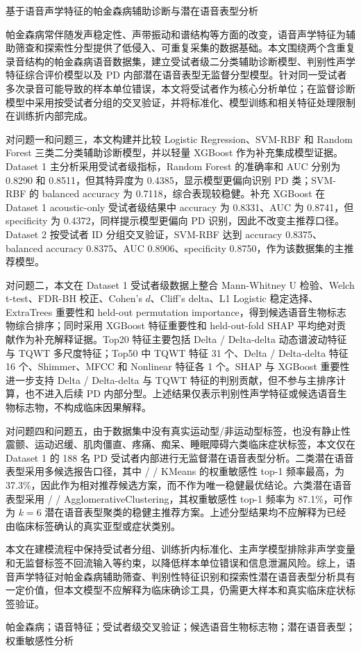 \begin{center}
{\heiti{} 基于语音声学特征的帕金森病辅助诊断与潜在语音表型分析}
\end{center}

帕金森病常伴随发声稳定性、声带振动和谱结构等方面的改变，语音声学特征为辅助筛查和探索性分型提供了低侵入、可重复采集的数据基础。本文围绕两个含重复录音结构的帕金森病语音数据集，建立受试者级二分类辅助诊断模型、判别性声学特征综合评价模型以及 PD 内部潜在语音表型无监督分型模型。针对同一受试者多次录音可能导致的样本单位错误，本文将受试者作为核心分析单位；在监督诊断模型中采用按受试者分组的交叉验证，并将标准化、模型训练和相关特征处理限制在训练折内部完成。

对问题一和问题三，本文构建并比较 Logistic Regression、SVM-RBF 和 Random Forest 三类二分类辅助诊断模型，并以轻量 XGBoost 作为补充集成模型证据。Dataset 1 主分析采用受试者级指标，Random Forest 的准确率和 AUC 分别为 0.8290 和 0.8511，但其特异度为 0.4385，显示模型更偏向识别 PD 类；SVM-RBF 的 balanced accuracy 为 0.7118，综合表现较稳健。补充 XGBoost 在 Dataset 1 acoustic-only 受试者级结果中 accuracy 为 0.8331、AUC 为 0.8741，但 specificity 为 0.4372，同样提示模型更偏向 PD 识别，因此不改变主推荐口径。Dataset 2 按受试者 ID 分组交叉验证，SVM-RBF 达到 accuracy 0.8375、balanced accuracy 0.8375、AUC 0.8906、specificity 0.8750，作为该数据集的主推荐模型。

对问题二，本文在 Dataset 1 受试者级数据上整合 Mann-Whitney U 检验、Welch t-test、FDR-BH 校正、Cohen's \(d\)、Cliff's delta、L1 Logistic 稳定选择、ExtraTrees 重要性和 held-out permutation importance，得到候选语音生物标志物综合排序；同时采用 XGBoost 特征重要性和 held-out-fold SHAP 平均绝对贡献作为补充解释证据。Top20 特征主要包括 Delta / Delta-delta 动态谱波动特征与 TQWT 多尺度特征；Top50 中 TQWT 特征 31 个、Delta / Delta-delta 特征 16 个、Shimmer、MFCC 和 Nonlinear 特征各 1 个。SHAP 与 XGBoost 重要性进一步支持 Delta / Delta-delta 与 TQWT 特征的判别贡献，但不参与主排序计算，也不进入后续 PD 内部分型。上述结果仅表示判别性声学特征或候选语音生物标志物，不构成临床因果解释。

对问题四和问题五，由于数据集中没有真实运动型/非运动型标签，也没有静止性震颤、运动迟缓、肌肉僵直、疼痛、痴呆、睡眠障碍六类临床症状标签，本文仅在 Dataset 1 的 188 名 PD 受试者内部进行无监督潜在语音表型分析。二类潜在语音表型采用多候选报告口径，其中  /  / KMeans 的权重敏感性 top-1 频率最高，为 37.3\%，因此作为相对推荐候选方案，而不作为唯一稳健最优结论。六类潜在语音表型采用  /  / AgglomerativeClustering，其权重敏感性 top-1 频率为 87.1\%，可作为 \(k=6\) 潜在语音表型聚类的稳健主推荐方案。上述分型结果均不应解释为已经由临床标签确认的真实亚型或症状类别。

本文在建模流程中保持受试者分组、训练折内标准化、主声学模型排除非声学变量和无监督标签不回流输入等约束，以降低样本单位错误和信息泄漏风险。综上，语音声学特征对帕金森病辅助筛查、判别性特征识别和探索性潜在语音表型分析具有一定价值，但本文模型不应解释为临床确诊工具，仍需更大样本和真实临床症状标签验证。

\vspace{1em}
 帕金森病；语音特征；受试者级交叉验证；候选语音生物标志物；潜在语音表型；权重敏感性分析
